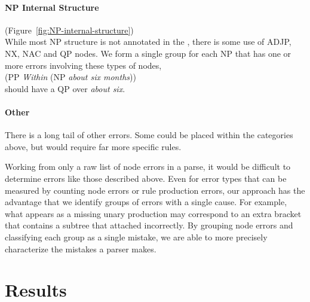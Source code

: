 \begin{landscape}
\begin{figure}
\begin{minipage}[b]{4in}
\centering

\end{minipage}\hfill
\begin{minipage}[b]{4in}
\centering

\end{minipage}
\end{figure}
\end{landscape}

\begin{figure}
\centering

\end{figure}

\paragraph{NP Internal Structure} (Figure~\ref{fig:NP-internal-structure}) \\
While most NP structure is not annotated in the \ptb, there is some use of ADJP, NX, NAC and QP nodes.
We form a single group for each NP that has one or more errors involving these types of nodes, \myeg \\
(PP \emph{Within} (NP \emph{about six months})) \\
should have a QP over \emph{about six}.

\paragraph{Other}
There is a long tail of other errors.
Some could be placed within the categories above, but would require far more specific rules.

Working from only a raw list of node errors in a parse, it would be difficult to determine errors like those described above.
Even for error types that can be measured by counting node errors or rule production errors, our approach has the advantage that we identify groups of errors with a single cause.
For example, what appears as a missing unary production may correspond to an extra bracket that contains a subtree that attached incorrectly.
By grouping node errors and classifying each group as a single mistake, we are able to more precisely characterize the mistakes a parser makes.

\section{Results} \label{sec:errors-results}

